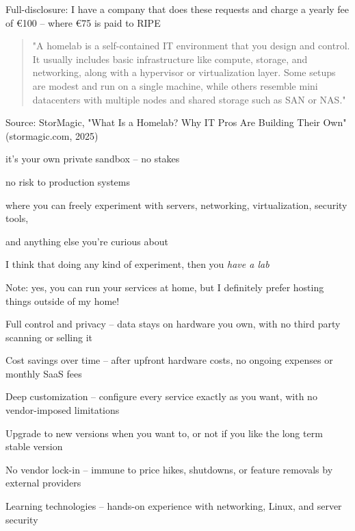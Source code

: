 \documentclass[Screen16to9,17pt]{foils}
\begin{document}
Full-disclosure: I have a company that does these requests and charge a yearly fee of €100 -- where €75 is paid to RIPE


\begin{quote}
"A homelab is a self-contained IT environment that you design and control. It usually includes basic infrastructure like compute, storage, and networking, along with a hypervisor or virtualization layer. Some setups are modest and run on a single machine, while others resemble mini datacenters with multiple nodes and shared storage such as SAN or NAS."
\end{quote}
Source: StorMagic, "What Is a Homelab? Why IT Pros Are Building Their Own" (stormagic.com, 2025)

\begin{list2}
\item it's your own private sandbox -- no stakes
\item no risk to production systems
\item where you can freely experiment with servers, networking, virtualization, security tools,
\item and anything else you're curious about
\item I think that doing any kind of experiment, then you \emph{have a lab}
\end{list2}

Note: yes, you can run your services at home, but I definitely prefer hosting things outside of my home!


\begin{list2}
\item Full control and privacy -- data stays on hardware you own, with no third party scanning or selling it
\item Cost savings over time -- after upfront hardware costs, no ongoing expenses or monthly SaaS fees
\item Deep customization -- configure every service exactly as you want, with no vendor-imposed limitations
\item Upgrade to new versions when you want to, or not if you like the long term stable version
\item No vendor lock-in -- immune to price hikes, shutdowns, or feature removals by external providers
\item Learning technologies -- hands-on experience with networking, Linux, and server security
\end{list2}
\end{document}
